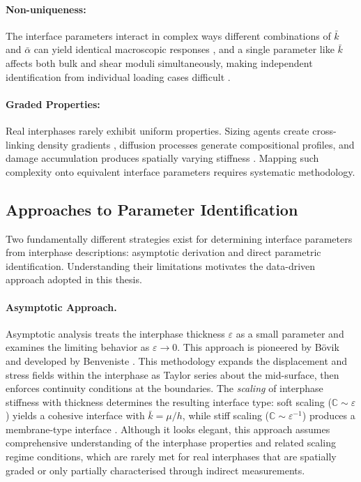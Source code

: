 \documentclass[oneside, 12pt, a4paper, bibliography=totoc]{book}
\begin{document}
\paragraph{Non-uniqueness:} The interface parameters interact in complex ways different combinations of $\bar{k}$ and $\bar{\alpha}$ can yield identical macroscopic responses \cite{Firooz2021}, and a single parameter like $\bar{k}$ affects both bulk and shear moduli simultaneously, making independent identification from individual loading cases difficult \cite{Firooz2019}.

\paragraph{Graded Properties:} Real interphases rarely exhibit uniform properties. Sizing agents create cross-linking density gradients \cite{Wu2019}, diffusion processes generate compositional profiles, and damage accumulation produces spatially varying stiffness \cite{Ciprari2006, Jones1991}. Mapping such complexity onto equivalent interface parameters requires systematic methodology.


\subsection{Approaches to Parameter Identification}
\label{subsec:approaches_param_id}

Two fundamentally different strategies exist for determining interface parameters from interphase descriptions: asymptotic derivation and direct parametric identification. Understanding their limitations motivates the data-driven approach adopted in this thesis.

\paragraph{Asymptotic Approach.}
Asymptotic analysis treats the interphase thickness $\varepsilon$ as a small parameter and examines the limiting behavior as $\varepsilon \to 0$. This approach is pioneered by B\"{o}vik \cite{Bovik1994} and developed by Benveniste \cite{Benveniste2006}. This methodology expands the displacement and stress fields within the interphase as Taylor series about the mid-surface, then enforces continuity conditions at the boundaries. The \textit{scaling} of interphase stiffness with thickness determines the resulting interface type: soft scaling ($\mathbb{C} \sim \varepsilon$) yields a cohesive interface with $\bar{k} = \mu/h$, while stiff scaling ($\mathbb{C} \sim \varepsilon^{-1}$) produces a membrane-type interface \cite{Lebon2010, Lebon2011}. Although it looks elegant, this approach assumes comprehensive understanding of the interphase properties and related scaling regime conditions, which are rarely met for real interphases that are spatially graded or only partially characterised through indirect measurements\cite{Lebon2010}.
\end{document}

